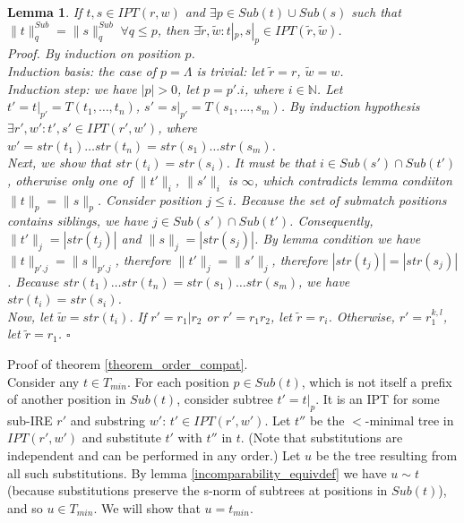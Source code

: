 \documentclass[AMA,STIX1COL]{WileyNJD-v2}
\newcommand{\YN}{\mathbb{N}}
\newcommand{\IPT}{I\!PT}
\newcommand{\snorm}[2]{\|{#1}\|^{Sub}_{#2}}
\newtheorem{XLem}{Lemma}
\begin{document}
    \begin{XLem}\label{lemma_subtrees}
    If $t, s \in \IPT(r, w)$ and $\exists p \in Sub(t) \cup Sub(s)$ such that $\snorm{t}{q} = \snorm{s}{q} \; \forall q \leq p$,
    then $\exists \widetilde{r}, \widetilde{w} : t|_p, s|_p \in \IPT(\widetilde{r}, \widetilde{w})$.
    \\
    Proof.
    By induction on position $p$.
    \\[-1em]

    Induction basis: the case of $p = \Lambda$ is trivial: let $\widetilde{r} = r$, $\widetilde{w} = w$.
    \\[-1em]

    Induction step: we have $|p| > 0$, let $p = p'.i$, where $i \in \YN$.
    Let $t' = t|_{p'} = T(t_1, \dots, t_n)$,
        $s' = s|_{p'} = T(s_1, \dots, s_m)$.
    By induction hypothesis $\exists r', w' : t', s' \in \IPT(r', w')$,
    where $w' = str(t_1) \dots str(t_n) = str(s_1) \dots str(s_m)$.
    \\[-1em]

    Next, we show that $str(t_i) = str(s_i)$.
    It must be that $i \in Sub(s') \cap Sub(t')$,
    otherwise only one of $\|t'\|_i$, $\|s'\|_i$ is $\infty$,
    which contradicts lemma condiiton $\|t\|_p = \|s\|_p$.
    Consider position $j \leq i$.
    Because the set of submatch positions contains siblings, we have $j \in Sub(s') \cap Sub(t')$.
    Consequently, $\|t'\|_j = |str(t_j)|$ and $\|s\|_j = |str(s_j)|$.
    By lemma condition we have $\|t\|_{p'.j} = \|s\|_{p'.j}$,
    therefore $\|t'\|_j = \|s'\|_j$,
    therefore $|str(t_j)| = |str(s_j)|$.
    Because $str(t_1) \dots str(t_n) = str(s_1) \dots str(s_m)$,
    we have $str(t_i) = str(s_i)$.
    \\[-1em]

    Now, let $\widetilde{w} = str(t_i)$.
    If $r' = r_1|r_2$ or $r' = r_1 r_2$, let $\widetilde{r} = r_i$.
    Otherwise, $r' = r_1^{k,l}$, let $\widetilde{r} = r_1$.
    $\square$
    \end{XLem}


    Proof of theorem \ref{theorem_order_compat}.
    \\[-1em]

    Consider any $t \in T_{min}$.
    For each position $p \in Sub(t)$, which is not itself a prefix of another position in $Sub(t)$,
    consider subtree $t' = t|_p$.
    It is an IPT for some sub-IRE $r'$ and substring $w'$: $t' \in \IPT(r', w')$.
    Let $t''$ be the $<$-minimal tree in $\IPT(r', w')$ and substitute $t'$ with $t''$ in $t$.
    (Note that substitutions are independent and can be performed in any order.)
    Let $u$ be the tree resulting from all such substitutions.
    By lemma \ref{incomparability_equivdef} we have $u \sim t$
    (because substitutions preserve the s-norm of subtrees at positions in $Sub(t)$),
    and so $u \in T_{min}$.
    We will show that $u = t_{min}$.
    \\[-1em]
\end{document}
